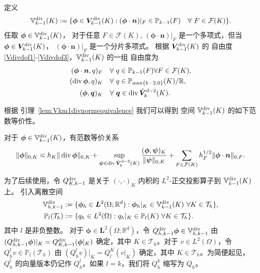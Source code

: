 定义 
\[
\mathbb{V}_{k-1}^{\rm div}(K):=\{\boldsymbol{\phi}\in\boldsymbol{V}_{k-1}^{\rm div}(K): (\boldsymbol{\phi}\cdot\boldsymbol{n})|_F\in\mathbb P_{k-1}(F) \quad\forall~F\in\mathcal F(K)\}.
\]
任取 $\boldsymbol{\phi}\in\mathbb{V}_{k-1}^{\rm div}(K)$，
对于任意 $F\in\mathcal F(K)$, $(\boldsymbol{\phi}\cdot\boldsymbol{n})|_F$ 
是一个多项式，但当 $\boldsymbol{\phi}\in\boldsymbol{V}_{k-1}^{\rm div}(K)$，
$(\boldsymbol{\phi}\cdot\boldsymbol{n})|_F$ 是一个分片多项式。
根据 $\boldsymbol{V}_{k-1}^{\rm div}(K)$ 的 自由度
\eqref{Vdivdof1}-\eqref{Vdivdof3}，$\mathbb{V}_{k-1}^{\rm div}(K)$ 的一组
自由度为 
\begin{align}
    (\boldsymbol{\phi}\cdot\boldsymbol{n}, q)_F & \quad\forall~q\in\mathbb
    P_{k-1}(F) \forall  F\in\mathcal F(K), \label{Vpdivdof1}\\
    (\operatorname{div}\boldsymbol{\phi}, q)_K & \quad\forall~q\in\mathbb P_{\max\{k-2,0\}}(K)/\mathbb R, \label{Vpdivdof2} \\
    (\boldsymbol{\phi}, \boldsymbol{q})_K & \quad\forall~\boldsymbol{q}\in \operatorname{div}\mathring{\boldsymbol{V}}_{k}^{d-2}(K). \label{Vpdivdof3}
\end{align}

根据 引理~\ref{lem:Vkm1divnormequivalence} 我们可以得到
空间 $\mathbb{V}_{k-1}^{\rm div}(K)$ 的如下范数等价性。
\begin{corollary}
对于 $\boldsymbol{\phi}\in\mathbb{V}_{k-1}^{\rm div}(K)$，有范数等价关系
\begin{equation}\label{eq:Vkm1divnormequiv}
\|\boldsymbol{\phi}\|_{0,K}\eqsim h_K\|\operatorname{div}\boldsymbol{\phi}\|_{0,K} + \sup_{\boldsymbol{\psi}\in\operatorname{div}\mathring{\boldsymbol{V}}_{k}^{d-2}(K)}\frac{(\boldsymbol{\phi}, \boldsymbol{\psi})_K}{\|\boldsymbol{\psi}\|_{0,K}} +\sum_{F\in\mathcal F(K)}h_F^{1/2}\|\boldsymbol{\phi}\cdot\boldsymbol{n}\|_{0,F}.
\end{equation}
\end{corollary}


为了后续使用，令 $Q_{K,k-1}^{\operatorname{div}}$ 是关于 $(\cdot, \cdot)_K$ 内积的 $L^2$-正交投影算子到 $\mathbb{V}_{k-1}^{\rm div}(K)$ 上。
引入离散空间
\begin{align*}
\mathbb{V}_{h,k-1}^{\rm div}&:=\{\boldsymbol{\phi}_h\in
    \boldsymbol{L}^2(\Omega;\mathbb R^d): \boldsymbol{\phi}_h|_K\in
    \mathbb{V}_{k-1}^{\rm div}(K) \ \forall K\in\mathcal T_h\}, \\
\mathbb P_l(\mathcal T_h)&:=\{q_h\in L^2(\Omega): q_h|_K\in \mathbb P_l(K)
\ \forall K\in\mathcal T_h\}.
\end{align*}
其中 $l$ 是非负整数。
对于 $\boldsymbol{\phi}\in\boldsymbol{L}^2(\Omega;\mathbb R^d)$，令 $Q_{h,k-1}^{\operatorname{div}}\boldsymbol{\phi}\in\mathbb{V}_{h,k-1}^{\rm div}$ 由 $(Q_{h,k-1}^{\operatorname{div}}\boldsymbol{\phi})|_K=Q_{K,k-1}^{\operatorname{div}}(\boldsymbol{\phi}|_K)$ 确定，其中 $K\in\mathcal T_h$。对于 $v\in L^2(\Omega)$，令 $Q_h^lv\in \mathbb P_l(\mathcal T_h)$ 由 $(Q_h^{l}v)|_K=Q_{l}^K(v|_K)$ 确定，其中 $K\in\mathcal T_h$。为简便起见，$Q_h^l$ 的向量版本仍记作 $Q_h^l$。如果 $l=k$，我们将 $Q_h^k$ 缩写为 $Q_h$。

